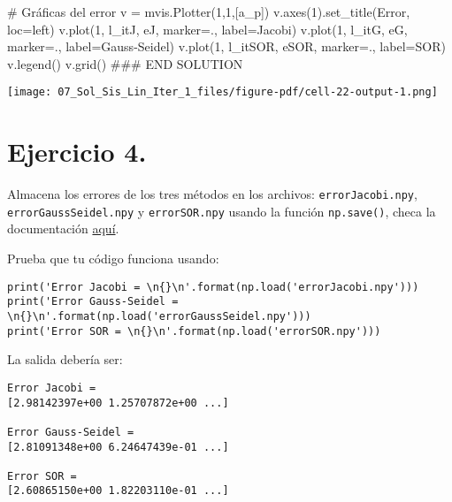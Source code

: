 \documentclass[
  letterpaper,
  DIV=11,
  numbers=noendperiod]{scrreprt}
\newenvironment{Shaded}{\begin{snugshade}}{\end{snugshade}}
\newcommand{\CommentTok}[1]{\textcolor[rgb]{0.37,0.37,0.37}{#1}}
\newcommand{\DecValTok}[1]{\textcolor[rgb]{0.68,0.00,0.00}{#1}}
\newcommand{\NormalTok}[1]{\textcolor[rgb]{0.00,0.23,0.31}{#1}}
\newcommand{\OperatorTok}[1]{\textcolor[rgb]{0.37,0.37,0.37}{#1}}
\newcommand{\RegionMarkerTok}[1]{\textcolor[rgb]{0.00,0.23,0.31}{#1}}
\newcommand{\StringTok}[1]{\textcolor[rgb]{0.13,0.47,0.30}{#1}}
\begin{document}
\begin{Shaded}
\begin{Highlighting}[]
\CommentTok{\# Gráficas del error}
\NormalTok{v }\OperatorTok{=}\NormalTok{ mvis.Plotter(}\DecValTok{1}\NormalTok{,}\DecValTok{1}\NormalTok{,[a\_p]) }
\NormalTok{v.axes(}\DecValTok{1}\NormalTok{).set\_title(}\StringTok{\textquotesingle{}Error\textquotesingle{}}\NormalTok{, loc}\OperatorTok{=}\StringTok{\textquotesingle{}left\textquotesingle{}}\NormalTok{)}
\NormalTok{v.plot(}\DecValTok{1}\NormalTok{, l\_itJ, eJ, marker}\OperatorTok{=}\StringTok{\textquotesingle{}.\textquotesingle{}}\NormalTok{, label}\OperatorTok{=}\StringTok{\textquotesingle{}Jacobi\textquotesingle{}}\NormalTok{)}
\NormalTok{v.plot(}\DecValTok{1}\NormalTok{, l\_itG, eG, marker}\OperatorTok{=}\StringTok{\textquotesingle{}.\textquotesingle{}}\NormalTok{, label}\OperatorTok{=}\StringTok{\textquotesingle{}Gauss{-}Seidel\textquotesingle{}}\NormalTok{)}
\NormalTok{v.plot(}\DecValTok{1}\NormalTok{, l\_itSOR, eSOR, marker}\OperatorTok{=}\StringTok{\textquotesingle{}.\textquotesingle{}}\NormalTok{, label}\OperatorTok{=}\StringTok{\textquotesingle{}SOR\textquotesingle{}}\NormalTok{)}
\NormalTok{v.legend()}
\NormalTok{v.grid()}
\CommentTok{\#\#\# }\RegionMarkerTok{END}\CommentTok{ SOLUTION}
\end{Highlighting}
\end{Shaded}

\texttt{[image: 07\_Sol\_Sis\_Lin\_Iter\_1\_files/figure-pdf/cell-22-output-1.png]}

\section{\texorpdfstring{\textbf{Ejercicio
4.}}{Ejercicio 4.}}\label{ejercicio-4.}

Almacena los errores de los tres métodos en los archivos:
\texttt{errorJacobi.npy}, \texttt{errorGaussSeidel.npy} y
\texttt{errorSOR.npy} usando la función \texttt{np.save()}, checa la
documentación
\href{https://numpy.org/doc/stable/reference/generated/numpy.save.html}{aquí}.

Prueba que tu código funciona usando:

\begin{verbatim}
print('Error Jacobi = \n{}\n'.format(np.load('errorJacobi.npy')))
print('Error Gauss-Seidel = \n{}\n'.format(np.load('errorGaussSeidel.npy')))
print('Error SOR = \n{}\n'.format(np.load('errorSOR.npy')))
\end{verbatim}

La salida debería ser:

\begin{verbatim}
Error Jacobi = 
[2.98142397e+00 1.25707872e+00 ...]

Error Gauss-Seidel = 
[2.81091348e+00 6.24647439e-01 ...]

Error SOR = 
[2.60865150e+00 1.82203110e-01 ...]
\end{verbatim}
\end{document}
